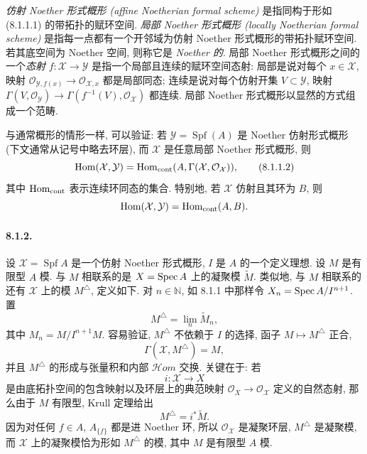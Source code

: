 \emph{仿射 Noether 形式概形 (affine Noetherian formal scheme)} 是指同构于形如 (8.1.1.1) 的带拓扑的赋环空间. \emph{局部 Noether 形式概形 (locally Noetherian formal scheme)} 是指每一点都有一个开邻域为仿射 Noether 形式概形的带拓扑赋环空间. 若其底空间为 Noether 空间, 则称它是 \emph{Noether 的}. 局部 Noether 形式概形之间的一个\emph{态射} $f:\mathcal X\to\mathcal Y$ 是指一个局部且连续的赋环空间态射: 局部是说对每个 $x\in\mathcal X$, 映射 $\mathcal O_{\mathcal Y,f(x)}\to\mathcal O_{\mathcal X,x}$ 都是局部同态; 连续是说对每个仿射开集 $V\subset\mathcal Y$, 映射 $\Gamma(V,\mathcal O_{\mathcal Y})\to\Gamma(f^{-1}(V),\mathcal O_{\mathcal X})$ 都连续. 局部 Noether 形式概形以显然的方式组成一个范畴.

与通常概形的情形一样, 可以验证: 若 $\mathcal Y=\operatorname{Spf}(A)$ 是 Noether 仿射形式概形 (下文通常从记号中略去环层), 而 $\mathcal X$ 是任意局部 Noether 形式概形, 则
\begin{equation}\operatorname{Hom}(\mathcal X,\mathcal Y)=\operatorname{Hom}_{\mathrm{cont}}(A,\Gamma(\mathcal X,\mathcal O_{\mathcal X})),\tag{8.1.1.2}\label{ch08:eq8112}\end{equation}
其中 $\operatorname{Hom}_{\mathrm{cont}}$ 表示连续环同态的集合. 特别地, 若 $\mathcal X$ 仿射且其环为 $B$, 则
\[\operatorname{Hom}(\mathcal X,\mathcal Y)=\operatorname{Hom}_{\mathrm{cont}}(A,B).\]

\paragraph{8.1.2.}
设 $\mathcal X=\operatorname{Spf}A$ 是一个仿射 Noether 形式概形, $I$ 是 $A$ 的一个定义理想. 设 $M$ 是有限型 $A$ 模. 与 $M$ 相联系的是 $X=\operatorname{Spec} A$ 上的凝聚模 $\widetilde M$. 类似地, 与 $M$ 相联系的还有 $\mathcal X$ 上的模 $M^\triangle$, 定义如下. 对 $n\in\mathbb N$, 如 8.1.1 中那样令 $X_n=\operatorname{Spec} A/I^{n+1}$. 置
\[M^\triangle=\lim_n\widetilde M_n,\]
其中 $M_n=M/I^{n+1}M$. 容易验证, $M^\triangle$ 不依赖于 $I$ 的选择, 函子 $M\mapsto M^\triangle$ 正合,
\[\Gamma(\mathcal X,M^\triangle)=M,\]
并且 $M^\triangle$ 的形成与张量积和内部 $\mathcal Hom$ 交换. 关键在于: 若
\[i:\mathcal X\longrightarrow X\]
是由底拓扑空间的包含映射以及环层上的典范映射 $\mathcal O_X\to\mathcal O_{\mathcal X}$ 定义的自然态射, 那么由于 $M$ 有限型, Krull 定理给出
\[M^\triangle=i^*\widetilde M.\]
因为对任何 $f\in A$, $A_{\{f\}}$ 都是进 Noether 环, 所以 $\mathcal O_{\mathcal X}$ 是凝聚环层, $M^\triangle$ 是凝聚模, 而 $\mathcal X$ 上的凝聚模恰为形如 $M^\triangle$ 的模, 其中 $M$ 是有限型 $A$ 模.

